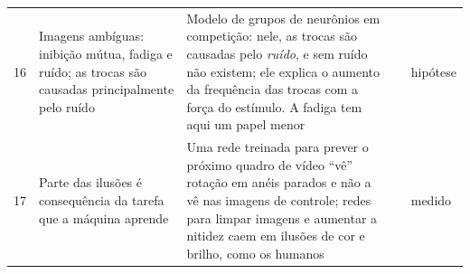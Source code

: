 {\begin{longtable}{>{\raggedright}p{0.5cm}>{\raggedright}p{4.0cm}>{\raggedright}p{5.6cm}>{\raggedright}p{2.3cm}>{\raggedright\arraybackslash}p{1.7cm}}
16 & Imagens ambíguas: inibição mútua, fadiga e ruído; as trocas são causadas principalmente pelo ruído & Modelo de grupos de neurônios em competição: nele, as trocas são causadas pelo \emph{ruído}, e sem ruído não existem; ele explica o aumento da frequência das trocas com a força do estímulo. A fadiga tem aqui um papel menor & \cite{MorenoBote2007} & hipótese \\
17 & Parte das ilusões é consequência da tarefa que a máquina aprende & Uma rede treinada para prever o próximo quadro de vídeo ``vê'' rotação em anéis parados e não a vê nas imagens de controle; redes para limpar imagens e aumentar a nitidez caem em ilusões de cor e brilho, como os humanos & \cite{Watanabe2018,GomezVilla2020} & medido \\
\bottomrule
\end{longtable}}
